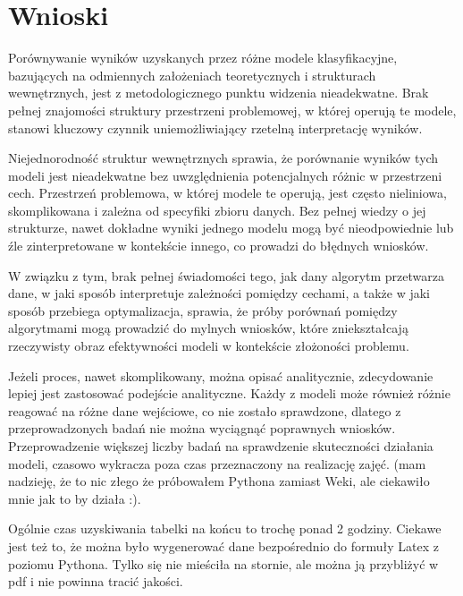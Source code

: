 \documentclass[polish,11pt,a4paper]{article}
\begin{document}
\section{Wnioski}
Porównywanie wyników uzyskanych przez różne modele klasyfikacyjne, bazujących na odmiennych założeniach teoretycznych i strukturach wewnętrznych, jest z metodologicznego punktu widzenia nieadekwatne. Brak pełnej znajomości struktury przestrzeni problemowej, w której operują te modele, stanowi kluczowy czynnik uniemożliwiający rzetelną interpretację wyników.



 Niejednorodność struktur wewnętrznych sprawia, że porównanie wyników tych modeli jest nieadekwatne bez uwzględnienia potencjalnych różnic w przestrzeni cech. Przestrzeń problemowa, w której modele te operują, jest często nieliniowa, skomplikowana i zależna od specyfiki zbioru danych. Bez pełnej wiedzy o jej strukturze, nawet dokładne wyniki jednego modelu mogą być nieodpowiednie lub źle zinterpretowane w kontekście innego, co prowadzi do błędnych wniosków.

W związku z tym, brak pełnej świadomości tego, jak dany algorytm przetwarza dane, w jaki sposób interpretuje zależności pomiędzy cechami, a także w jaki sposób przebiega optymalizacja, sprawia, że próby porównań pomiędzy algorytmami mogą prowadzić do mylnych wniosków, które zniekształcają rzeczywisty obraz efektywności modeli w kontekście złożoności problemu.

Jeżeli proces, nawet skomplikowany, można opisać analitycznie, zdecydowanie lepiej jest zastosować podejście analityczne. Każdy z modeli może również różnie reagować na różne dane wejściowe, co nie zostało sprawdzone, dlatego z przeprowadzonych badań nie można wyciągnąć poprawnych wniosków. Przeprowadzenie większej liczby badań na sprawdzenie skuteczności działania modeli, czasowo wykracza poza czas przeznaczony na realizację zajęć. (mam nadzieję, że to nic złego że próbowałem Pythona zamiast Weki, ale ciekawiło mnie jak to by działa :). 

Ogólnie czas uzyskiwania tabelki na końcu to trochę ponad 2 godziny. Ciekawe jest też to, że można było wygenerować dane bezpośrednio do formuły Latex z  poziomu Pythona. Tylko się nie mieściła na stornie, ale można ją przybliżyć w pdf i nie powinna tracić jakości. 


\clearpage


\end{document}
